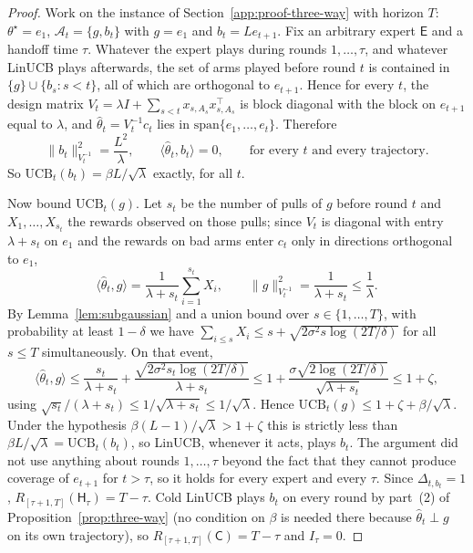 \documentclass[anon]{alt2027} %
\newcommand{\Cold}{\mathsf{C}}
\newcommand{\Exp}{\mathsf{E}}
\newcommand{\Hyb}{\mathsf{H}}
\begin{document}
\begin{proof}
Work on the instance of Section~\ref{app:proof-three-way} with horizon $T$:
$\theta^\star=e_1$, $\mathcal A_t=\{g,b_t\}$ with $g=e_1$ and
$b_t=Le_{t+1}$. Fix an arbitrary expert $\Exp$ and a handoff time $\tau$.
Whatever the expert plays during rounds $1,\dots,\tau$, and whatever LinUCB
plays afterwards, the set of arms played before round $t$ is contained in
$\{g\}\cup\{b_s:s<t\}$, all of which are orthogonal to $e_{t+1}$. Hence for
every $t$, the design matrix $V_t=\lambda I+\sum_{s<t}x_{s,A_s}x_{s,A_s}^\top$
is block diagonal with the block on $e_{t+1}$ equal to $\lambda$, and
$\widehat\theta_t=V_t^{-1}c_t$ lies in $\mathrm{span}\{e_1,\dots,e_t\}$. Therefore
\[
\|b_t\|_{V_t^{-1}}^2=\frac{L^2}{\lambda},\qquad \langle\widehat\theta_t,b_t\rangle=0,
\qquad\text{for every }t\text{ and every trajectory.}
\]
So $\mathrm{UCB}_t(b_t)=\beta L/\sqrt\lambda$ exactly, for all $t$.

Now bound $\mathrm{UCB}_t(g)$. Let $s_t$ be the number of pulls of $g$ before
round $t$ and $X_1,\dots,X_{s_t}$ the rewards observed on those pulls; since
$V_t$ is diagonal with entry $\lambda+s_t$ on $e_1$ and the rewards on bad
arms enter $c_t$ only in directions orthogonal to $e_1$,
\[
\langle\widehat\theta_t,g\rangle=\frac{1}{\lambda+s_t}\sum_{i=1}^{s_t}X_i,
\qquad
\|g\|_{V_t^{-1}}^2=\frac{1}{\lambda+s_t}\le\frac1\lambda .
\]
By Lemma~\ref{lem:subgaussian} and a union bound over $s\in\{1,\dots,T\}$,
with probability at least $1-\delta$ we have
$\sum_{i\le s}X_i\le s+\sqrt{2\sigma^2s\log(2T/\delta)}$ for all $s\le T$
simultaneously. On that event,
\[
\langle\widehat\theta_t,g\rangle
\le\frac{s_t}{\lambda+s_t}+\frac{\sqrt{2\sigma^2s_t\log(2T/\delta)}}{\lambda+s_t}
\le 1+\frac{\sigma\sqrt{2\log(2T/\delta)}}{\sqrt{\lambda+s_t}}
\le 1+\zeta ,
\]
using $\sqrt{s_t}/(\lambda+s_t)\le1/\sqrt{\lambda+s_t}\le1/\sqrt\lambda$.
Hence $\mathrm{UCB}_t(g)\le1+\zeta+\beta/\sqrt\lambda$. Under the hypothesis
$\beta(L-1)/\sqrt\lambda>1+\zeta$ this is strictly less than
$\beta L/\sqrt\lambda=\mathrm{UCB}_t(b_t)$, so LinUCB, whenever it acts, plays
$b_t$. The argument did not use anything about rounds $1,\dots,\tau$ beyond
the fact that they cannot produce coverage of $e_{t+1}$ for $t>\tau$, so it
holds for every expert and every $\tau$. Since $\Delta_{t,b_t}=1$,
$R_{[\tau+1,T]}(\Hyb_\tau)=T-\tau$. Cold LinUCB plays $b_t$ on every round by
part~(2) of Proposition~\ref{prop:three-way} (no condition on $\beta$ is
needed there because $\widehat\theta_t\perp g$ on its own trajectory), so
$R_{[\tau+1,T]}(\Cold)=T-\tau$ and $I_\tau=0$.
\end{proof}
\end{document}
